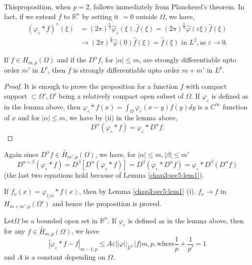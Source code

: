 \begin{remark*} %
  This\pageoriginale proposition, when $p = 2$, follows immediately from
  Plancherel's theorem. In fact, if we extend $f$ to $\mathbb{R}^n$ by
  setting it $= 0$ outside $\Omega$, we have, 
  \begin{align*}
    (\varphi_ \varepsilon * f)^\wedge (\xi) &  = (2 \pi
    )^{\frac{n}{2}} \hat{\varphi}_ \varepsilon (\xi). \hat{f} (\xi) =
    (2 \pi)^{\frac{n}{2}} \hat{\varphi} (\varepsilon \xi ) \hat{f}
    (\xi)\\ 
    & \to (2 \pi)^{\frac{n}{2}} \hat{\varphi}(0) \hat{f}(\xi) = \hat{f}
    (\xi) \text { in } L^2, \text {as } \varepsilon \to 0.  
  \end{align*}
\end{remark*}

\setcounter{proposition}{0}
\begin{proposition}\label{chap3:sec5:prop1} %
  If $f \in H_{m, p}(\Omega)$ and if the $D^\alpha f$, for $| \alpha |
  \le m$, are strongly differentiable upto order $m' $ in $L^p$, then
  $f$ is strongly differentiable upto order $m + m '$ in $L^p$. 
\end{proposition}

\begin{proof}
  It is enough to prove the proposition for a function $f$ with
  compact support $\subset \Omega',  \Omega'$ being a relatively
  compact open subset of $\Omega$. If $\varphi_ \varepsilon$ is
  defined as in the lemma above, then $\varphi_ \varepsilon * f(x) =
  \int_\Omega \varphi_ \varepsilon (x- y) f(y) dy$ is a $C^\infty$
  function of $x$ and for $| \alpha | \le m$, we have by (ii) in the
  lemma above, 
  $$
  D^\alpha (\varphi_ \varepsilon * f) = \varphi_ \varepsilon * D^\alpha f.
  $$
\end{proof}

Again since $D^\alpha f \in \overset{\circ}{H}_{m', p}  (\Omega)$, we have,
for $| \alpha | \le m, | \beta | \le m'$ 
$$
D^{\alpha + \beta} (\varphi_ \varepsilon * f) = D^\beta [D^\alpha
  (\varphi_ \varepsilon * f) ] = D^\beta (\varphi_ \varepsilon *
D^\alpha f) = \varphi_ \varepsilon * D^\beta (D^\alpha f) 
$$
(the last two equations hold because of Lemma \ref{chap3:sec5:lem1}).

If $f_\nu (x) = \varphi_{1/ \nu}* f(x)$, then by Lemma \ref{chap3:sec5:lem1} (i),  $f_\nu
\to f$ in $H_{m + m', p} (\Omega')$ and hence the proposition is
proved. 

\begin{proposition}\label{chap3:sec5:prop2}%
  Let\pageoriginale $\Omega$ be a bounded open set in $\mathbb{R}^n$. If $\varphi_
  \varepsilon$ is defined as in the lemma above, then  for any $f \in
  \overset{\circ}{H}_{m, p}  (\Omega)$, we have  
  $$
  | \varphi_ \varepsilon * f - f |_{m - 1, p} \le A \varepsilon ||
  \varphi ||_{L^{p'}} | f | m, p,  \text {where} \frac{1}{p}+
  \frac{1}{p'} = 1 
  $$
  and $A$ is a constant depending on $\Omega$.
\end{proposition}

